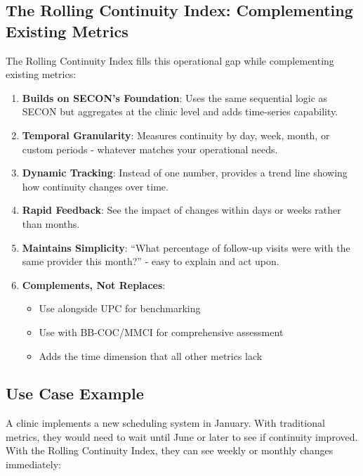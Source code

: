 \documentclass[11pt,a4paper]{article}
\begin{document}
\subsection{The Rolling Continuity Index: Complementing Existing Metrics}

The Rolling Continuity Index fills this operational gap while complementing existing metrics:

\begin{enumerate}
\item \textbf{Builds on SECON's Foundation}: Uses the same sequential logic as SECON but aggregates at the clinic level and adds time-series capability.

\item \textbf{Temporal Granularity}: Measures continuity by day, week, month, or custom periods - whatever matches your operational needs.

\item \textbf{Dynamic Tracking}: Instead of one number, provides a trend line showing how continuity changes over time.

\item \textbf{Rapid Feedback}: See the impact of changes within days or weeks rather than months.

\item \textbf{Maintains Simplicity}: ``What percentage of follow-up visits were with the same provider this month?'' - easy to explain and act upon.

\item \textbf{Complements, Not Replaces}:
\begin{itemize}
\item Use alongside UPC for benchmarking
\item Use with BB-COC/MMCI for comprehensive assessment
\item Adds the time dimension that all other metrics lack
\end{itemize}
\end{enumerate}

\subsection{Use Case Example}

A clinic implements a new scheduling system in January. With traditional metrics, they would need to wait until June or later to see if continuity improved. With the Rolling Continuity Index, they can see weekly or monthly changes immediately:
\end{document}
